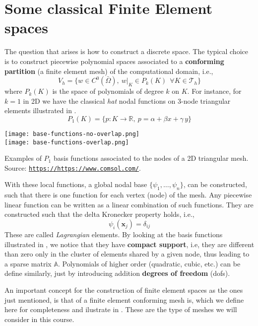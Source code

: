 \section{Some classical Finite Element spaces}

The question that arises is how to construct a discrete space.
The typical choice is to construct piecewise polynomial spaces
associated to a \textbf{conforming partition} (a finite element mesh) 
of the computational domain,
i.e.,
\begin{equation}
V_h =  \{ w \in C^0(\bar{\Omega}),~\left. w \right |_K \in P_{k}(K)~~\forall K \in \mathcal{T}_h\} \nonumber
\end{equation}
where $P_{k}(K)$ is the space of polynomials of degree $k$ on $K$.
For instance, for $k = 1$ in 2D we have the classical \emph{hat} nodal functions
on 3-node triangular elements illustrated in .
\begin{equation*}
	P_1(K) = \{p: K \rightarrow \mathbb{R}, ~p = \alpha + \beta x + \gamma \, y \}   
\end{equation*}
\begin{marginfigure}[-5.0cm]
	\texttt{[image: base-functions-no-overlap.png]}\\
	\texttt{[image: base-functions-overlap.png]}   
	\caption[]{Examples of $P_1$ basis functions associated to the nodes of a 2D triangular mesh.
		Source: \href{https://www.comsol.com/}{\texttt{https://https://www.comsol.com/}}.}
\end{marginfigure}

With these local functions, a global nodal base $\{\psi_1, \dots, \psi_n \}$, 
can be constructed, such that there is one function for each vertex (node)
of the mesh. Any piecewise linear function can be written as a
linear combination of such functions. They are constructed
such that the delta Kronecker property holds, i.e.,
$$
\psi_i(\mathbf{x}_j) = \delta_{ij}
$$
These are called \emph{Lagrangian} elements.
By looking at the basis functions illustrated in , we notice that they have
\textbf{compact support}, i.e, they are different than zero only in the cluster of elements
shared by a given node, thus leading to a sparse matrix $\mathbb{A}$.
Polynomials of higher order (quadratic, cubic, etc.) can be define similarly, just by introducing addition \textbf{degrees of freedom} (dofs).

An important concept for the construction of finite element spaces
as the ones just mentioned, is that of a finite element conforming mesh is, which 
we define here for completeness and ilustrate in .
These are the type of meshes we will consider in this course.

